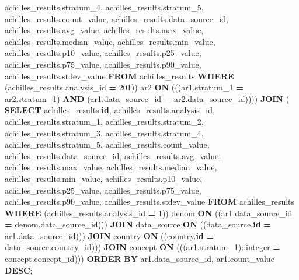 \documentclass[
]{book}
\newenvironment{Shaded}{\begin{snugshade}}{\end{snugshade}}
\newcommand{\CharTok}[1]{\textcolor[rgb]{0.31,0.60,0.02}{#1}}
\newcommand{\DecValTok}[1]{\textcolor[rgb]{0.00,0.00,0.81}{#1}}
\newcommand{\KeywordTok}[1]{\textcolor[rgb]{0.13,0.29,0.53}{\textbf{#1}}}
\newcommand{\NormalTok}[1]{#1}
\newcommand{\OperatorTok}[1]{\textcolor[rgb]{0.81,0.36,0.00}{\textbf{#1}}}
\begin{document}
\begin{Shaded}
\begin{Highlighting}[]
\NormalTok{           achilles\_results.stratum\_4,}
\NormalTok{           achilles\_results.stratum\_5,}
\NormalTok{           achilles\_results.count\_value,}
\NormalTok{           achilles\_results.data\_source\_id,}
\NormalTok{           achilles\_results.avg\_value,}
\NormalTok{           achilles\_results.max\_value,}
\NormalTok{           achilles\_results.median\_value,}
\NormalTok{           achilles\_results.min\_value,}
\NormalTok{           achilles\_results.p10\_value,}
\NormalTok{           achilles\_results.p25\_value,}
\NormalTok{           achilles\_results.p75\_value,}
\NormalTok{           achilles\_results.p90\_value,}
\NormalTok{           achilles\_results.stdev\_value}
          \KeywordTok{FROM}\NormalTok{ achilles\_results}
         \KeywordTok{WHERE}\NormalTok{ (achilles\_results.analysis\_id }\OperatorTok{=} \DecValTok{201}\NormalTok{)) ar2}
           \KeywordTok{ON}\NormalTok{ (((ar1.stratum\_1 }\OperatorTok{=}\NormalTok{ ar2.stratum\_1)}
             \KeywordTok{AND}\NormalTok{ (ar1.data\_source\_id }\OperatorTok{=}\NormalTok{ ar2.data\_source\_id))))}
    \KeywordTok{JOIN}\NormalTok{ ( }\KeywordTok{SELECT}\NormalTok{ achilles\_results.}\KeywordTok{id}\NormalTok{,}
\NormalTok{           achilles\_results.analysis\_id,}
\NormalTok{           achilles\_results.stratum\_1,}
\NormalTok{           achilles\_results.stratum\_2,}
\NormalTok{           achilles\_results.stratum\_3,}
\NormalTok{           achilles\_results.stratum\_4,}
\NormalTok{           achilles\_results.stratum\_5,}
\NormalTok{           achilles\_results.count\_value,}
\NormalTok{           achilles\_results.data\_source\_id,}
\NormalTok{           achilles\_results.avg\_value,}
\NormalTok{           achilles\_results.max\_value,}
\NormalTok{           achilles\_results.median\_value,}
\NormalTok{           achilles\_results.min\_value,}
\NormalTok{           achilles\_results.p10\_value,}
\NormalTok{           achilles\_results.p25\_value,}
\NormalTok{           achilles\_results.p75\_value,}
\NormalTok{           achilles\_results.p90\_value,}
\NormalTok{           achilles\_results.stdev\_value}
          \KeywordTok{FROM}\NormalTok{ achilles\_results}
         \KeywordTok{WHERE}\NormalTok{ (achilles\_results.analysis\_id }\OperatorTok{=} \DecValTok{1}\NormalTok{)) denom}
           \KeywordTok{ON}\NormalTok{ ((ar1.data\_source\_id }\OperatorTok{=}\NormalTok{ denom.data\_source\_id)))}
    \KeywordTok{JOIN}\NormalTok{ data\_source }\KeywordTok{ON}\NormalTok{ ((data\_source.}\KeywordTok{id} \OperatorTok{=}\NormalTok{ ar1.data\_source\_id)))}
    \KeywordTok{JOIN}\NormalTok{ country}
      \KeywordTok{ON}\NormalTok{ ((country.}\KeywordTok{id} \OperatorTok{=}\NormalTok{ data\_source.country\_id)))}
    \KeywordTok{JOIN}\NormalTok{ concept}
      \KeywordTok{ON}\NormalTok{ (((ar1.stratum\_1):}\CharTok{:integer} \OperatorTok{=}\NormalTok{ concept.concept\_id)))}
 \KeywordTok{ORDER} \KeywordTok{BY}\NormalTok{ ar1.data\_source\_id, ar1.count\_value }\KeywordTok{DESC}\NormalTok{;}
\end{Highlighting}
\end{Shaded}
\end{document}
